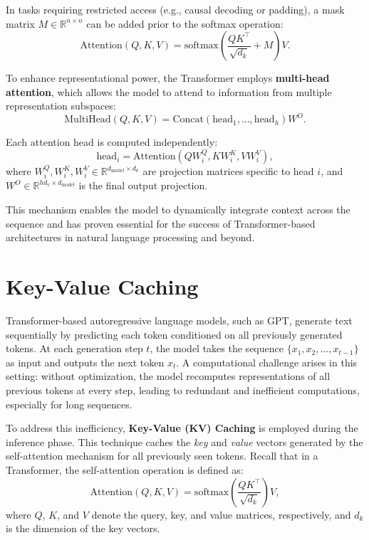 In tasks requiring restricted access (e.g., causal decoding or padding), a mask matrix \(M \in \mathbb{R}^{n \times n}\) can be added prior to the softmax operation:
\begin{equation*}
	\text{Attention}(Q, K, V) = \text{softmax}\left( \frac{QK^\top}{\sqrt{d_k}} + M \right)V.
\end{equation*}

To enhance representational power, the Transformer employs \textbf{multi-head attention}, which allows the model to attend to information from multiple representation subspaces:
\begin{equation}
	\text{MultiHead}(Q, K, V) = \text{Concat}(\text{head}_1, \dots, \text{head}_h) W^O.
\end{equation}

Each attention head is computed independently:
\begin{equation}
	\text{head}_i = \text{Attention}(Q W_i^Q, K W_i^K, V W_i^V),
\end{equation}
where \(W_i^Q, W_i^K, W_i^V \in \mathbb{R}^{d_{\text{model}} \times d_k}\) are projection matrices specific to head \(i\), and \(W^O \in \mathbb{R}^{hd_v \times d_{\text{model}}}\) is the final output projection.

This mechanism enables the model to dynamically integrate context across the sequence and has proven essential for the success of Transformer-based architectures in natural language processing and beyond.

\section{Key-Value Caching}\label{sec:kv-caching}

Transformer-based autoregressive language models, such as GPT, generate text sequentially by predicting each token conditioned on all previously generated tokens. At each generation step \(t\), the model takes the sequence \(\{x_1, x_2, \dots, x_{t-1}\}\) as input and outputs the next token \(x_t\). A computational challenge arises in this setting: without optimization, the model recomputes representations of all previous tokens at every step, leading to redundant and inefficient computations, especially for long sequences.

To address this inefficiency, \textbf{Key-Value (KV) Caching} is employed during the inference phase. This technique caches the \textit{key} and \textit{value} vectors generated by the self-attention mechanism for all previously seen tokens. Recall that in a Transformer, the self-attention operation is defined as:
\begin{equation*}
	\mathrm{Attention}(Q, K, V) = \mathrm{softmax}\left(\frac{QK^\top}{\sqrt{d_k}}\right)V,
\end{equation*}
where \(Q\), \(K\), and \(V\) denote the query, key, and value matrices, respectively, and \(d_k\) is the dimension of the key vectors.

